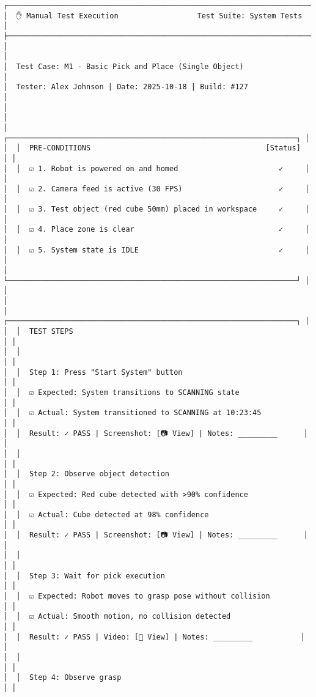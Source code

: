 \documentclass[
]{article}
\begin{document}
\begin{verbatim}
┌────────────────────────────────────────────────────────────────────────┐
│  ✋ Manual Test Execution                  Test Suite: System Tests    │
├────────────────────────────────────────────────────────────────────────┤
│                                                                        │
│  Test Case: M1 - Basic Pick and Place (Single Object)                 │
│  Tester: Alex Johnson | Date: 2025-10-18 | Build: #127                │
│                                                                        │
│  ┌──────────────────────────────────────────────────────────────────┐ │
│  │  PRE-CONDITIONS                                        [Status]  │ │
│  │  ☑ 1. Robot is powered on and homed                       ✓     │ │
│  │  ☑ 2. Camera feed is active (30 FPS)                      ✓     │ │
│  │  ☑ 3. Test object (red cube 50mm) placed in workspace     ✓     │ │
│  │  ☑ 4. Place zone is clear                                 ✓     │ │
│  │  ☑ 5. System state is IDLE                                ✓     │ │
│  └──────────────────────────────────────────────────────────────────┘ │
│                                                                        │
│  ┌──────────────────────────────────────────────────────────────────┐ │
│  │  TEST STEPS                                                      │ │
│  │                                                                   │ │
│  │  Step 1: Press "Start System" button                             │ │
│  │  ☑ Expected: System transitions to SCANNING state                │ │
│  │  ☑ Actual: System transitioned to SCANNING at 10:23:45           │ │
│  │  Result: ✓ PASS | Screenshot: [📷 View] | Notes: _________      │ │
│  │                                                                   │ │
│  │  Step 2: Observe object detection                                │ │
│  │  ☑ Expected: Red cube detected with >90% confidence              │ │
│  │  ☑ Actual: Cube detected at 98% confidence                       │ │
│  │  Result: ✓ PASS | Screenshot: [📷 View] | Notes: _________      │ │
│  │                                                                   │ │
│  │  Step 3: Wait for pick execution                                 │ │
│  │  ☑ Expected: Robot moves to grasp pose without collision         │ │
│  │  ☑ Actual: Smooth motion, no collision detected                  │ │
│  │  Result: ✓ PASS | Video: [🎥 View] | Notes: _________           │ │
│  │                                                                   │ │
│  │  Step 4: Observe grasp                                           │ │

\end{verbatim}
\end{document}
